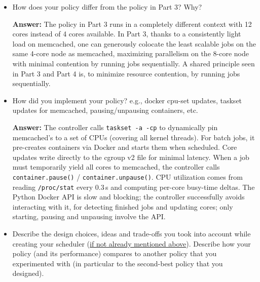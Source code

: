 \begin{enumerate}
\begin{itemize}
    \textbf{Why:}
    Radix and barnes start concurrently, because they are splash2x workloads and require power-of-two thread counts. Allocating 1 and 2 threads respectively and running them concurrently is preferable over over-allocating 4 threads to each. Finishing them early simplifies sequential scheduling afterwards. Blackscholes starts as soon as either one finishes, overlapping with the remaining unfinished job. The Phase 2 PARSEC jobs (canneal, freqmine, streamcluster, vips) run sequentially on 3 threads to minimize contention.
    \\

\item How does your policy differ from the policy in Part 3? Why?

\textbf{Answer:} %
The policy in Part 3 runs in a completely different context with 12 cores instead of 4 cores available. In Part 3, thanks to a consistently light load on memcached, one can generously colocate the least scalable jobs on the same 4-core node as memcached, maximizing parallelism on the 8-core node with minimal contention by running jobs sequentially. A shared principle seen in Part 3 and Part 4 is, to minimize resource contention, by running jobs sequentially.
\\

\item How did you implement your policy? e.g., docker cpu-set updates, taskset updates for memcached, pausing/unpausing containers, etc.

\textbf{Answer:} %
The controller calls \texttt{taskset -a -cp} to dynamically pin memcached's to a set of CPUs (covering all kernel threads). For batch jobs, it pre-creates containers via Docker and starts them when scheduled. Core updates write directly to the cgroup v2 file for minimal latency. When a job must temporarily yield all cores to memcached, the controller calls \texttt{container.pause()} / \texttt{container.unpause()}. CPU utilization comes from reading \texttt{/proc/stat} every 0.3\,s and computing per-core busy-time deltas. The Python Docker API is slow and blocking; the controller successfully avoids interacting with it, for detecting finished jobs and updating cores; only starting, pausing and unpausing involve the API.
\\

\item Describe the design choices, ideas and trade-offs you took into account while creating your scheduler (\underline{if not already mentioned above}). Describe how your policy (and its performance) compares to another policy that you experimented with (in particular to the second-best policy that you designed).


\end{itemize}
\end{enumerate}
